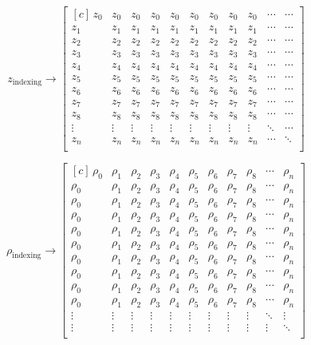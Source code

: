
\[
z_\mathrm{indexing} \rightarrow 
\begin{bmatrix*}[c] \,
z_0 & z_0 & z_0 & z_0 & z_0 & z_0 & z_0 & z_0 & z_0 & \cdots & \cdots\\
z_1 & z_1 & z_1 & z_1 & z_1 & z_1 & z_1 & z_1 & z_1 & \cdots & \cdots\\
z_2 & z_2 & z_2 & z_2 & z_2 & z_2 & z_2 & z_2 & z_2 & \cdots & \cdots\\
z_3 & z_3 & z_3 & z_3 & z_3 & z_3 & z_3 & z_3 & z_3 & \cdots & \cdots\\
z_4 & z_4 & z_4 & z_4 & z_4 & z_4 & z_4 & z_4 & z_4 & \cdots & \cdots\\
z_5 & z_5 & z_5 & z_5 & z_5 & z_5 & z_5 & z_5 & z_5 & \cdots & \cdots\\
z_6 & z_6 & z_6 & z_6 & z_6 & z_6 & z_6 & z_6 & z_6 & \cdots & \cdots\\
z_7 & z_7 & z_7 & z_7 & z_7 & z_7 & z_7 & z_7 & z_7 & \cdots & \cdots\\
z_8 & z_8 & z_8 & z_8 & z_8 & z_8 & z_8 & z_8 & z_8 & \cdots & \cdots\\
\vdots & \vdots & \vdots & \vdots & \vdots & \vdots & \vdots & \vdots & \vdots & \ddots & \cdots\\
z_n & z_n & z_n & z_n & z_n & z_n & z_n & z_n & z_n & \cdots & \ddots\\
\end{bmatrix*}
\]

\[
\rho_\mathrm{indexing} \rightarrow 
\begin{bmatrix*}[c] \,
\rho_0 & \rho_1 & \rho_2 & \rho_3 & \rho_4 & \rho_5 & \rho_6 & \rho_7 & \rho_8 & \cdots & \rho_n\\
\rho_0 & \rho_1 & \rho_2 & \rho_3 & \rho_4 & \rho_5 & \rho_6 & \rho_7 & \rho_8 & \cdots & \rho_n\\
\rho_0 & \rho_1 & \rho_2 & \rho_3 & \rho_4 & \rho_5 & \rho_6 & \rho_7 & \rho_8 & \cdots & \rho_n\\
\rho_0 & \rho_1 & \rho_2 & \rho_3 & \rho_4 & \rho_5 & \rho_6 & \rho_7 & \rho_8 & \cdots & \rho_n\\
\rho_0 & \rho_1 & \rho_2 & \rho_3 & \rho_4 & \rho_5 & \rho_6 & \rho_7 & \rho_8 & \cdots & \rho_n\\
\rho_0 & \rho_1 & \rho_2 & \rho_3 & \rho_4 & \rho_5 & \rho_6 & \rho_7 & \rho_8 & \cdots & \rho_n\\
\rho_0 & \rho_1 & \rho_2 & \rho_3 & \rho_4 & \rho_5 & \rho_6 & \rho_7 & \rho_8 & \cdots & \rho_n\\
\rho_0 & \rho_1 & \rho_2 & \rho_3 & \rho_4 & \rho_5 & \rho_6 & \rho_7 & \rho_8 & \cdots & \rho_n\\
\rho_0 & \rho_1 & \rho_2 & \rho_3 & \rho_4 & \rho_5 & \rho_6 & \rho_7 & \rho_8 & \cdots & \rho_n\\
\rho_0 & \rho_1 & \rho_2 & \rho_3 & \rho_4 & \rho_5 & \rho_6 & \rho_7 & \rho_8 & \cdots & \rho_n\\
\vdots & \vdots & \vdots & \vdots & \vdots & \vdots & \vdots & \vdots & \vdots & \ddots & \vdots \\
\vdots & \vdots & \vdots & \vdots & \vdots & \vdots & \vdots & \vdots & \vdots & \vdots & \ddots \\
\end{bmatrix*}
\]

